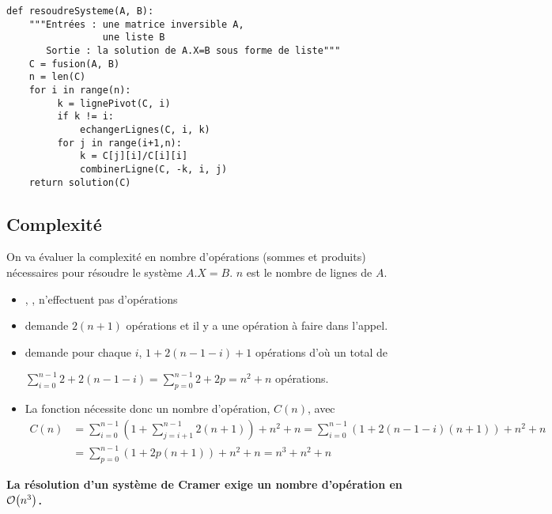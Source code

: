 \newpage

\begin{lstlisting}
def resoudreSysteme(A, B):
    """Entrées : une matrice inversible A, 
                 une liste B
       Sortie : la solution de A.X=B sous forme de liste"""
    C = fusion(A, B)
    n = len(C)
    for i in range(n):
         k = lignePivot(C, i)
         if k != i: 
             echangerLignes(C, i, k)
         for j in range(i+1,n):
             k = C[j][i]/C[i][i]
             combinerLigne(C, -k, i, j)
    return solution(C)
\end{lstlisting}
\subsection{Complexité}
On va évaluer la complexité en nombre d'opérations (sommes et produits) nécessaires pour résoudre le système $A.X=B$.
$n$ est le nombre de lignes de $A$.

\begin{itemize}
\item {}, ,  n'effectuent pas d'opérations
\item {} demande $2(n+1)$ opérations et il y a une opération à faire dans l'appel.
\item {} demande pour chaque $i$, $1+2(n-1-i)+1$ opérations d'où un total de

$\displaystyle \sum_{i=0}^{n-1}2+2(n-1-i)= \sum_{p=0}^{n-1}2+2p=n^2+n$ opérations.
\item La fonction  nécessite donc un nombre d'opération, $C(n)$, avec
\begin{align*}
C(n)
&
=\sum_{i=0}^{n-1}\left(1+ \sum_{j=i+1}^{n-1}2(n+1)\right)+n^2+n
=\sum_{i=0}^{n-1} \left(1+2(n-1-i)(n+1)\right)+n^2+n
\\ &
=\sum_{p=0}^{n-1} \left(1+2p(n+1)\right)+n^2+n
=n^3+n^2+n
\end{align*}
\end{itemize}
\begin{center}
\bf La résolution d'un système de Cramer exige un nombre d'opération en ${\cal O}\bigl(n^3\bigr)$.
\end{center}
